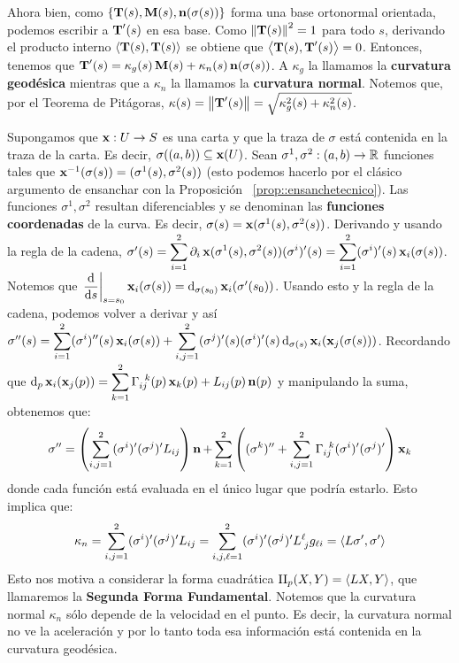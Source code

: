 Ahora bien, como $\{\operatorname{\mathbf{T}}(s),\operatorname{\mathbf{M}}(s),\operatorname{\mathbf{n}}(\sigma(s))\}$ forma una base ortonormal orientada, podemos escribir a $\operatorname{\mathbf{T}}'(s)$ en esa base. Como $\left\| \operatorname{\mathbf{T}}(s) \right\|^2=1$ para todo $s$, derivando el producto interno $\left\langle \operatorname{\mathbf{T}}(s),\operatorname{\mathbf{T}}(s) \right\rangle$ se obtiene que $\left\langle \operatorname{\mathbf{T}}(s),\operatorname{\mathbf{T}}'(s) \right\rangle=0$. Entonces, tenemos que $\operatorname{\mathbf{T}}'(s)=\kappa_g(s)\operatorname{\mathbf{M}}(s) + \kappa_n(s)\operatorname{\mathbf{n}}(\sigma(s))$. A $\kappa_g$ la llamamos la \textbf{curvatura geodésica} mientras que a $\kappa_n$ la llamamos la \textbf{curvatura normal}. Notemos que, por el Teorema de Pitágoras, $\kappa(s)=\left\| \operatorname{\mathbf{T}}'(s) \right\| = \sqrt{\kappa_g^2(s) + \kappa_n^2(s)}$. 

Supongamos que $\operatorname{\mathbf{x}}:U\to S$ es una carta y que la traza de $\sigma$ está contenida en la traza de la carta. Es decir, $\sigma((a,b))\subseteq\operatorname{\mathbf{x}}(U)$. Sean $\sigma^1,\sigma^2:(a,b)\to\mathbb{R}$ funciones tales que $\operatorname{\mathbf{x}}^{-1}(\sigma(s))=(\sigma^1(s),\sigma^2(s))$ (esto podemos hacerlo por el clásico argumento de ensanchar con la Proposición ~\ref{prop::ensanchetecnico}). Las funciones $\sigma^1,\sigma^2$ resultan diferenciables y se denominan las \textbf{funciones coordenadas} de la curva. Es decir, $\sigma(s)=\operatorname{\mathbf{x}}(\sigma^1(s),\sigma^2(s))$. Derivando y usando la regla de la cadena, $\sigma'(s)=\displaystyle\sum_{i=1}^2 \partial_i\operatorname{\mathbf{x}}(\sigma^1(s),\sigma^2(s))(\sigma^i)'(s) = \displaystyle\sum_{i=1}^2 (\sigma^i)'(s)\operatorname{\mathbf{x}}_i(\sigma(s))$. Notemos que $\left.\dfrac{\mathop{}\!\mathrm{d}}{\mathop{}\!\mathrm{d} s}\right\rvert_{s=s_0} \operatorname{\mathbf{x}}_i(\sigma(s)) = \mathop{}\!\mathrm{d}_{\sigma(s_0)}\operatorname{\mathbf{x}}_i(\sigma'(s_0))$. Usando esto y la regla de la cadena, podemos volver a derivar y así $\sigma''(s)=\displaystyle\sum_{i=1}^2 (\sigma^i)''(s)\operatorname{\mathbf{x}}_i(\sigma(s)) + \displaystyle\sum_{i,j=1}^2 (\sigma^j)'(s)(\sigma^i)'(s) \mathop{}\!\mathrm{d}_{\sigma(s)}\operatorname{\mathbf{x}}_i(\operatorname{\mathbf{x}}_j(\sigma(s)))$. Recordando que $\mathop{}\!\mathrm{d}_p \operatorname{\mathbf{x}}_i(\operatorname{\mathbf{x}}_j(p)) = \displaystyle\sum_{k=1}^2 \Gamma_{ij}^{\;\;k}(p)\operatorname{\mathbf{x}}_k(p) + L_{ij}(p)\operatorname{\mathbf{n}}(p)$ y manipulando la suma, obtenemos que: $$\sigma''=\left(\displaystyle\sum_{i,j=1}^2 (\sigma^i)'(\sigma^j)'L_{ij}\right)\operatorname{\mathbf{n}} + \displaystyle\sum_{k=1}^2 \left((\sigma^k)'' + \displaystyle\sum_{i,j=1}^2 \Gamma_{ij}^{\;\;k}(\sigma^i)'(\sigma^j)'\right)\operatorname{\mathbf{x}}_k$$ donde cada función está evaluada en el único lugar que podría estarlo. Esto implica que: $$\kappa_n = \displaystyle\sum_{i,j=1}^2 (\sigma^i)'(\sigma^j)'L_{ij} = \displaystyle\sum_{i,j,\ell=1}^2 (\sigma^i)'(\sigma^j)'L^{\ell}_{\;j}g_{\ell i} = \left\langle L\sigma',\sigma' \right\rangle$$ Esto nos motiva a considerar la forma cuadrática $\mathrm{II}_p(X,Y)=\left\langle LX,Y \right\rangle$, que llamaremos la \textbf{Segunda Forma Fundamental}. Notemos que la curvatura normal $\kappa_n$ sólo depende de la velocidad en el punto. Es decir, la curvatura normal no ve la aceleración y por lo tanto toda esa información está contenida en la curvatura geodésica.


